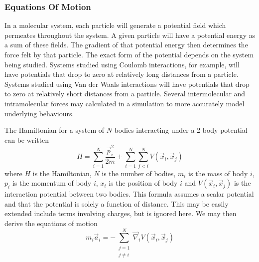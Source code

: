 \subsubsection{Equations Of Motion}

%
In a molecular system, each particle will generate a potential field
which permeates throughout the system.
%
A given particle will have a potential energy as a sum of these fields.
%
The gradient of that potential energy then determines
the force felt by that particle.
%
The exact form of the potential depends on the system being studied.
%
Systems studied using Coulomb interactions, for example,
will have potentials that drop to zero at relatively long distances
from a particle.
%
Systems studied using Van der Waals interactions will have
potentials that drop to zero at relatively short distances from
a particle.
%
Several intermolecular and intramolecular forces may
calculated in a simulation to more accurately model underlying behaviours.


%
The Hamiltonian for a system of $N$ bodies
interacting under a 2-body potential can be written
\begin{equation}
    H = \sum_{i=1}^N \frac{\vec{p}_i^2}{2 m}
        + \sum_{i=1}^N \sum_{j<i}^N V(\vec{x}_i, \vec{x}_j)
\end  {equation}
where $H$ is the Hamiltonian,
$N$ is the number of bodies,
$m_i$ is the mass of body $i$,
$p_i$ is the momentum of body $i$,
$x_i$ is the position of body $i$ and
$V(\vec{x}_i, \vec{x}_j)$ is the interaction potential between two bodies.
This formula assumes a scalar potential and
that the potential is solely a function of distance.
%
This may be easily extended include terms involving charges,
but is ignored here.
%
We may then derive the equations of motion
\begin{equation}
    m_i \vec{a}_i = -\sum_{\substack{j=1\\j\ne{}i}}^N
                    \vec{\nabla}_i V(\vec{x}_i, \vec{x}_j)
\end  {equation}


